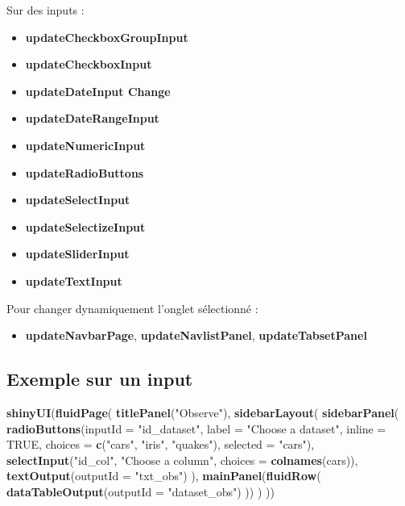 \documentclass[
]{article}
\newenvironment{Shaded}{\begin{snugshade}}{\end{snugshade}}
\newcommand{\AttributeTok}[1]{\textcolor[rgb]{0.13,0.29,0.53}{#1}}
\newcommand{\ConstantTok}[1]{\textcolor[rgb]{0.56,0.35,0.01}{#1}}
\newcommand{\FunctionTok}[1]{\textcolor[rgb]{0.13,0.29,0.53}{\textbf{#1}}}
\newcommand{\NormalTok}[1]{#1}
\newcommand{\StringTok}[1]{\textcolor[rgb]{0.31,0.60,0.02}{#1}}
\providecommand{\tightlist}{%
  \setlength{\itemsep}{0pt}\setlength{\parskip}{0pt}}
\begin{document}
Sur des inputs :

\begin{itemize}
\tightlist
\item
  \textbf{updateCheckboxGroupInput}
\item
  \textbf{updateCheckboxInput}
\item
  \textbf{updateDateInput Change}
\item
  \textbf{updateDateRangeInput}
\item
  \textbf{updateNumericInput}
\item
  \textbf{updateRadioButtons}
\item
  \textbf{updateSelectInput}
\item
  \textbf{updateSelectizeInput}
\item
  \textbf{updateSliderInput}
\item
  \textbf{updateTextInput}
\end{itemize}

Pour changer dynamiquement l'onglet sélectionné :

\begin{itemize}
\tightlist
\item
  \textbf{updateNavbarPage}, \textbf{updateNavlistPanel},
  \textbf{updateTabsetPanel}
\end{itemize}

\hypertarget{exemple-sur-un-input}{%
\subsection{Exemple sur un input}\label{exemple-sur-un-input}}

\begin{Shaded}
\begin{Highlighting}[]
\FunctionTok{shinyUI}\NormalTok{(}\FunctionTok{fluidPage}\NormalTok{(}
  \FunctionTok{titlePanel}\NormalTok{(}\StringTok{"Observe"}\NormalTok{),}
  \FunctionTok{sidebarLayout}\NormalTok{(}
    \FunctionTok{sidebarPanel}\NormalTok{(}
      \FunctionTok{radioButtons}\NormalTok{(}\AttributeTok{inputId =} \StringTok{"id\_dataset"}\NormalTok{, }\AttributeTok{label =} \StringTok{"Choose a dataset"}\NormalTok{, }\AttributeTok{inline =} \ConstantTok{TRUE}\NormalTok{,}
                   \AttributeTok{choices =} \FunctionTok{c}\NormalTok{(}\StringTok{"cars"}\NormalTok{, }\StringTok{"iris"}\NormalTok{, }\StringTok{"quakes"}\NormalTok{), }\AttributeTok{selected =} \StringTok{"cars"}\NormalTok{),}
      \FunctionTok{selectInput}\NormalTok{(}\StringTok{"id\_col"}\NormalTok{, }\StringTok{"Choose a column"}\NormalTok{, }\AttributeTok{choices =} \FunctionTok{colnames}\NormalTok{(cars)),}
      \FunctionTok{textOutput}\NormalTok{(}\AttributeTok{outputId =} \StringTok{"txt\_obs"}\NormalTok{)}
\NormalTok{    ),}
    \FunctionTok{mainPanel}\NormalTok{(}\FunctionTok{fluidRow}\NormalTok{(}
      \FunctionTok{dataTableOutput}\NormalTok{(}\AttributeTok{outputId =} \StringTok{"dataset\_obs"}\NormalTok{)}
\NormalTok{    ))}
\NormalTok{  )}
\NormalTok{))}
\end{Highlighting}
\end{Shaded}
\end{document}
